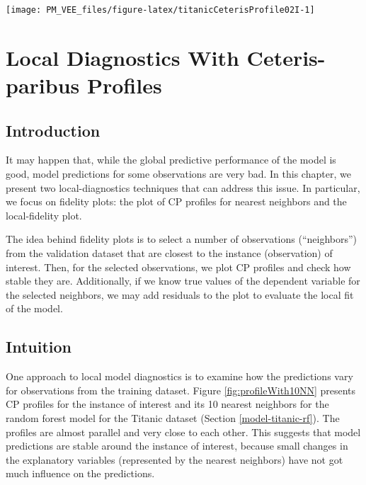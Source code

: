 \documentclass[12pt,]{krantz}
\theoremstyle{definition}
\theoremstyle{definition}
\theoremstyle{definition}
\theoremstyle{remark}
\begin{document}
\begin{center}\texttt{[image: PM\_VEE\_files/figure-latex/titanicCeterisProfile02I-1]} \end{center}

\hypertarget{localDiagnostics}{%
\section{Local Diagnostics With Ceteris-paribus
Profiles}\label{localDiagnostics}}

\hypertarget{cPLocDiagIntro}{%
\subsection{Introduction}\label{cPLocDiagIntro}}

It may happen that, while the global predictive performance of the model
is good, model predictions for some observations are very bad. In this
chapter, we present two local-diagnostics techniques that can address
this issue. In particular, we focus on fidelity plots: the plot of CP
profiles for nearest neighbors and the local-fidelity plot.

The idea behind fidelity plots is to select a number of observations
(``neighbors'') from the validation dataset that are closest to the
instance (observation) of interest. Then, for the selected observations,
we plot CP profiles and check how stable they are. Additionally, if we
know true values of the dependent variable for the selected neighbors,
we may add residuals to the plot to evaluate the local fit of the model.

\hypertarget{cPLocDiagIntuition}{%
\subsection{Intuition}\label{cPLocDiagIntuition}}

One approach to local model diagnostics is to examine how the
predictions vary for observations from the training dataset. Figure
\ref{fig:profileWith10NN} presents CP profiles for the instance of
interest and its 10 nearest neighbors for the random forest model for
the Titanic dataset (Section \ref{model-titanic-rf}). The profiles are
almost parallel and very close to each other. This suggests that model
predictions are stable around the instance of interest, because small
changes in the explanatory variables (represented by the nearest
neighbors) have not got much influence on the predictions.
\end{document}

